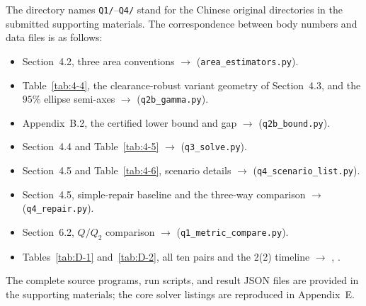\noindent The directory names \texttt{Q1/}--\texttt{Q4/} stand for the Chinese original directories in the submitted supporting materials. The correspondence between body numbers and data files is as follows:
\begin{itemize}
\item Section~4.2, three area conventions $\to$  (\texttt{area\_estimators.py}).
\item Table~\ref{tab:4-4}, the clearance-robust variant geometry of Section~4.3, and the $95\%$ ellipse semi-axes $\to$  (\texttt{q2b\_gamma.py}).
\item Appendix~B.2, the certified lower bound and gap $\to$  (\texttt{q2b\_bound.py}).
\item Section~4.4 and Table~\ref{tab:4-5} $\to$  (\texttt{q3\_solve.py}).
\item Section~4.5 and Table~\ref{tab:4-6}, scenario details $\to$  (\texttt{q4\_scenario\_list.py}).
\item Section~4.5, simple-repair baseline and the three-way comparison $\to$  (\texttt{q4\_repair.py}).
\item Section~6.2, $Q/Q_2$ comparison $\to$  (\texttt{q1\_metric\_compare.py}).
\item Tables~\ref{tab:D-1} and~\ref{tab:D-2}, all ten pairs and the 2(2) timeline $\to$ , .
\end{itemize}

\noindent The complete source programs, run scripts, and result JSON files are provided in the supporting materials; the core solver listings are reproduced in Appendix~E.

